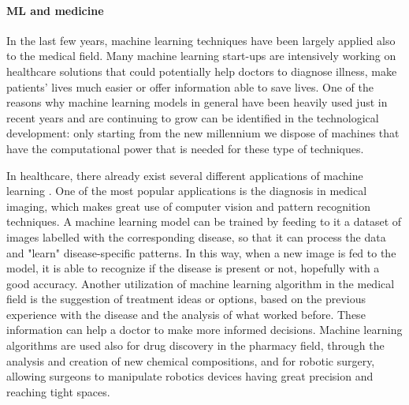 \paragraph{ML and medicine} In the last few years, machine learning techniques have been largely applied also to the medical field. Many machine learning start-ups are intensively working on healthcare solutions that could potentially help doctors to diagnose illness, make patients' lives much easier or offer information able to save lives. One of the reasons why machine learning models in general have been heavily used just in recent years and are continuing to grow can be identified in the technological development: only starting from the new millennium we dispose of machines that have the computational power that is needed for these type of techniques.

In healthcare, there already exist several different applications of machine learning \cite{emerj:MLhealthcareapplication}. One of the most popular applications is the diagnosis in medical imaging, which makes great use of computer vision and pattern recognition techniques. A machine learning model can be trained by feeding to it a dataset of images labelled with the corresponding disease, so that it can process the data and "learn" disease-specific patterns. In this way, when a new image is fed to the model, it is able to recognize if the disease is present or not, hopefully with a good accuracy. Another utilization of machine learning algorithm in the medical field is the suggestion of treatment ideas or options, based on the previous experience with the disease and the analysis of what worked before. These information can help a doctor to make more informed decisions. Machine learning algorithms are used also for drug discovery in the pharmacy field, through the analysis and creation of new chemical compositions, and for robotic surgery, allowing surgeons to manipulate robotics devices having great precision and reaching tight spaces.

